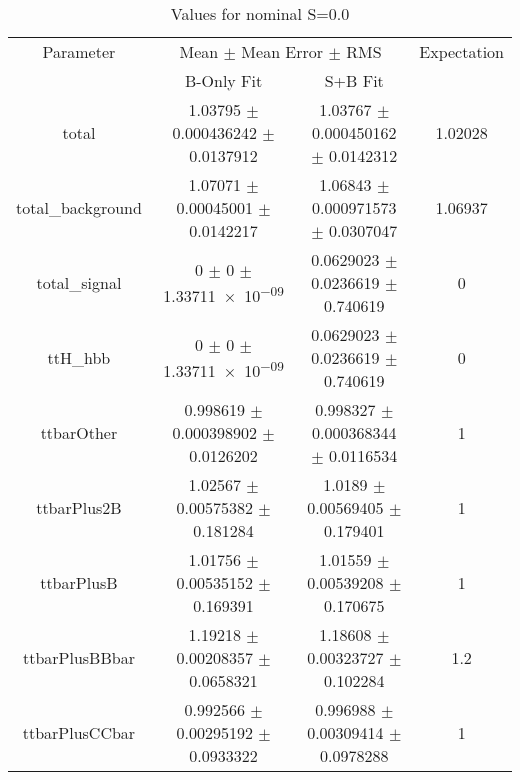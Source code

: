 \begin{table}
\centering
\caption{Values for nominal S=0.0}
\begin{tabular}{cccc}
\toprule
Parameter & \multicolumn{2}{c}{Mean $\pm$ Mean Error $\pm$ RMS} & Expectation\\
 & B-Only Fit & S+B Fit & \\
\midrule
total & \num{1.03795} $\pm$ \num{0.000436242} $\pm$ \num{0.0137912} & \num{1.03767} $\pm$ \num{0.000450162} $\pm$ \num{0.0142312} & \num{1.02028}\\
total\_background & \num{1.07071} $\pm$ \num{0.00045001} $\pm$ \num{0.0142217} & \num{1.06843} $\pm$ \num{0.000971573} $\pm$ \num{0.0307047} & \num{1.06937}\\
total\_signal & \num{0} $\pm$ \num{0} $\pm$ \num{1.33711e-09} & \num{0.0629023} $\pm$ \num{0.0236619} $\pm$ \num{0.740619} & \num{0}\\
ttH\_hbb & \num{0} $\pm$ \num{0} $\pm$ \num{1.33711e-09} & \num{0.0629023} $\pm$ \num{0.0236619} $\pm$ \num{0.740619} & \num{0}\\
ttbarOther & \num{0.998619} $\pm$ \num{0.000398902} $\pm$ \num{0.0126202} & \num{0.998327} $\pm$ \num{0.000368344} $\pm$ \num{0.0116534} & \num{1}\\
ttbarPlus2B & \num{1.02567} $\pm$ \num{0.00575382} $\pm$ \num{0.181284} & \num{1.0189} $\pm$ \num{0.00569405} $\pm$ \num{0.179401} & \num{1}\\
ttbarPlusB & \num{1.01756} $\pm$ \num{0.00535152} $\pm$ \num{0.169391} & \num{1.01559} $\pm$ \num{0.00539208} $\pm$ \num{0.170675} & \num{1}\\
ttbarPlusBBbar & \num{1.19218} $\pm$ \num{0.00208357} $\pm$ \num{0.0658321} & \num{1.18608} $\pm$ \num{0.00323727} $\pm$ \num{0.102284} & \num{1.2}\\
ttbarPlusCCbar & \num{0.992566} $\pm$ \num{0.00295192} $\pm$ \num{0.0933322} & \num{0.996988} $\pm$ \num{0.00309414} $\pm$ \num{0.0978288} & \num{1}\\
\bottomrule
\end{tabular}
\end{table}